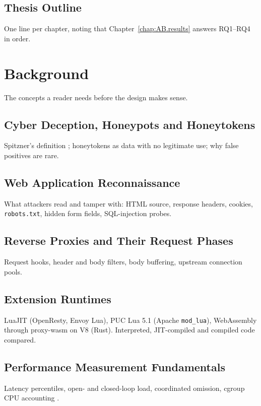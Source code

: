 \documentclass{rptuma}
\begin{document}
\section{Thesis Outline}
One line per chapter, noting that Chapter~\ref{chap:AB.results} answers RQ1--RQ4 in order.

\chapter{Background}
The concepts a reader needs before the design makes sense.

\section{Cyber Deception, Honeypots and Honeytokens}
Spitzner's definition \cite{spitzner2002honeypots,spitzner2003honeytokens}; honeytokens as data with
no legitimate use; why false positives are rare.

\section{Web Application Reconnaissance}
What attackers read and tamper with: HTML source, response headers, cookies, \texttt{robots.txt},
hidden form fields, SQL-injection probes.

\section{Reverse Proxies and Their Request Phases}
Request hooks, header and body filters, body buffering, upstream connection pools.

\section{Extension Runtimes}
LuaJIT (OpenResty, Envoy Lua), PUC Lua 5.1 (Apache \texttt{mod\_lua}), WebAssembly through
proxy-wasm on V8 (Rust). Interpreted, JIT-compiled and compiled code compared.

\section{Performance Measurement Fundamentals}
Latency percentiles, open- and closed-loop load, coordinated omission, cgroup CPU accounting
\cite{jain1991art}.
\end{document}
